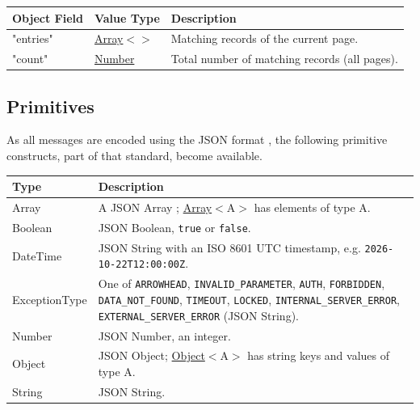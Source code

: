 \documentclass[a4paper]{arrowhead}
\newcommand{\mref}[2][]{{\textcolor{ArrowheadPurple}{\hyperref[sec:model:#2]{\ifstrempty{#1}{#2}{#1}}}}}
\newcommand{\pdef}[1]{{\textcolor{ArrowheadGrey}{#1 \label{sec:model:primitives:#1} \label{sec:model:primitives:#1s}}}}
\newcommand{\pref}[1]{{\textcolor{ArrowheadGrey}{\hyperref[sec:model:primitives:#1]{#1}}}}
\begin{document}
\noindent\begin{tabularx}{\textwidth}{| >{\raggedright\arraybackslash}p{3.9cm} | >{\raggedright\arraybackslash\small}p{5.3cm} | X |} \hline
\rowcolor{gray!33} Object Field & Value Type & Description \\ \hline
"entries" & \pref{Array}$<$\allowbreak{}\mref{BlacklistEntry}$>$ & Matching records of the current page. \\ \hline
"count" & \pref{Number} & Total number of matching records (all pages). \\ \hline
\end{tabularx}



\subsection{Primitives}
\label{sec:model:primitives}

As all messages are encoded using the JSON format \cite{rfc8259}, the following primitive constructs, part of that standard, become available.

\noindent\begin{tabularx}{\textwidth}{| p{4.6cm} | X |} \hline
\rowcolor{gray!33} Type & Description \\ \hline
\pdef{Array} & A JSON Array \cite{rfc8259}; \pref{Array}$<$A$>$ has elements of type A. \\ \hline
\pdef{Boolean} & JSON Boolean, \texttt{true} or \texttt{false}. \\ \hline
\pdef{DateTime} & JSON String with an ISO 8601 UTC timestamp, e.g. \texttt{2026-10-22T12:00:00Z}. \\ \hline
\pdef{ExceptionType} & One of \texttt{ARROWHEAD}, \texttt{INVALID\_\allowbreak{}PARAMETER}, \texttt{AUTH}, \texttt{FORBIDDEN}, \texttt{DATA\_\allowbreak{}NOT\_\allowbreak{}FOUND}, \texttt{TIMEOUT}, \texttt{LOCKED}, \texttt{INTERNAL\_\allowbreak{}SERVER\_\allowbreak{}ERROR}, \texttt{EXTERNAL\_\allowbreak{}SERVER\_\allowbreak{}ERROR} (JSON String). \\ \hline
\pdef{Number} & JSON Number, an integer. \\ \hline
\pdef{Object} & JSON Object; \pref{Object}$<$A$>$ has string keys and values of type A. \\ \hline
\pdef{String} & JSON String. \\ \hline
\end{tabularx}

\newpage



\end{document}

